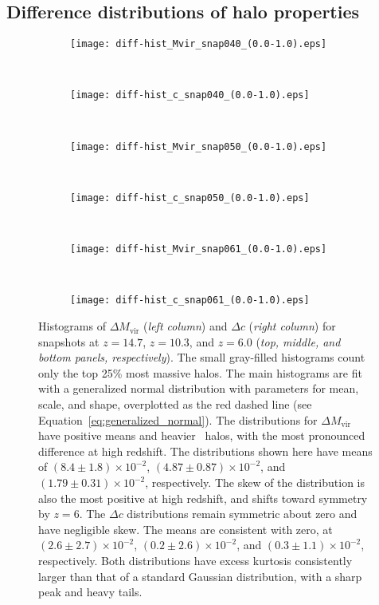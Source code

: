 \subsection{Difference distributions of halo properties}


\begin{figure*}[t]
	\centering
	\begin{subfigure}{}
		\texttt{[image: diff-hist\_Mvir\_snap040\_(0.0-1.0).eps]}
	\end{subfigure}
	~
	\begin{subfigure}{}
		\texttt{[image: diff-hist\_c\_snap040\_(0.0-1.0).eps]}
	\end{subfigure}
	\\
	\begin{subfigure}{}
		\texttt{[image: diff-hist\_Mvir\_snap050\_(0.0-1.0).eps]}
	\end{subfigure}
	~
	\begin{subfigure}{}
		\texttt{[image: diff-hist\_c\_snap050\_(0.0-1.0).eps]}
	\end{subfigure}
	\\
	\begin{subfigure}{}
		\texttt{[image: diff-hist\_Mvir\_snap061\_(0.0-1.0).eps]}
	\end{subfigure}
	~
	\begin{subfigure}{}
		\texttt{[image: diff-hist\_c\_snap061\_(0.0-1.0).eps]}
	\end{subfigure}
	\caption[Histograms of $\Delta M_{\mathrm{vir}}$ and $\Delta c$]{\footnotesize Histograms of $\Delta M_{\mathrm{vir}}$ (\textit{left column}) and $\Delta c$ (\textit{right column}) for snapshots at $z = 14.7$, $z = 10.3$, and $z = 6.0$ (\textit{top, middle, and bottom panels, respectively}).  The small gray-filled histograms count only the top 25\% most massive halos.  The main histograms are fit with a generalized normal distribution with parameters for mean, scale, and shape, overplotted as the red dashed line (see Equation~\ref{eq:generalized_normal}).  The distributions for $\Delta M_{\mathrm{vir}}$ have positive means and heavier \lpt\ halos, with the most pronounced difference at high redshift.  The distributions shown here have means of $(8.4 \pm 1.8) \times 10^{-2}$, $(4.87 \pm 0.87) \times 10^{-2}$, and $(1.79 \pm 0.31) \times 10^{-2}$, respectively.  The skew of the distribution is also the most positive at high redshift, and shifts toward symmetry by $z = 6$.  The $\Delta c$ distributions remain symmetric about zero and have negligible skew.  The means are consistent with zero, at $(2.6 \pm 2.7) \times 10^{-2}$, $(0.2 \pm 2.6) \times 10^{-2}$, and $(0.3 \pm 1.1) \times 10^{-2}$, respectively.  Both distributions have excess kurtosis consistently larger than that of a standard Gaussian distribution, with a sharp peak and heavy tails.}
	\label{fig:diff-hist}
\end{figure*}

